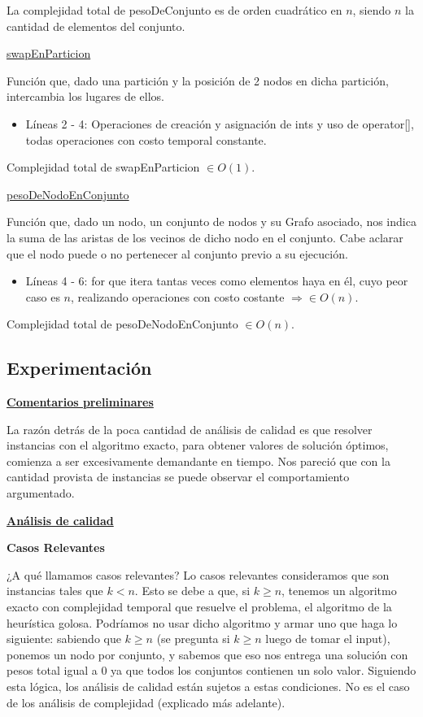 \documentclass[10pt,a4paper]{article}
\begin{document}
La complejidad total de pesoDeConjunto es de orden cuadrático en $n$, siendo $n$ la cantidad de elementos del conjunto.

\underline{swapEnParticion}

Función que, dado una partición y la posición de 2 nodos en dicha partición, intercambia los lugares de ellos.

\begin{itemize}
\item Líneas 2 - 4: Operaciones de creación y asignación de ints y uso de operator[], todas operaciones con costo temporal constante.
\end{itemize}

Complejidad total de swapEnParticion $\in O(1)$.

\underline{pesoDeNodoEnConjunto}

Función que, dado un nodo, un conjunto de nodos y su Grafo asociado, nos indica la suma de las aristas de los vecinos de dicho nodo en el conjunto. Cabe aclarar que el nodo puede o no pertenecer al conjunto previo a su ejecución.

\begin{itemize}
\item Líneas 4 - 6: for que itera tantas veces como elementos haya en él, cuyo peor caso es $n$, realizando operaciones con costo costante $\Rightarrow \in O(n)$.
\end{itemize}

Complejidad total de pesoDeNodoEnConjunto $\in O(n)$.

\newpage
\subsection{Experimentación}
\noindent \textbf{\underline{Comentarios preliminares}}

La razón detrás de la poca cantidad de análisis de calidad es que resolver instancias con el algoritmo exacto, para obtener valores de solución óptimos, comienza a ser excesivamente demandante en tiempo. Nos pareció que con la cantidad provista de instancias se puede observar el comportamiento argumentado.

\noindent \textbf{\underline{Análisis de calidad}}

\textbf{Casos Relevantes}

¿A qué llamamos casos relevantes? Lo casos relevantes consideramos que son instancias tales que $k < n$. Esto se debe a que, si $k \geq n$, tenemos un algoritmo exacto con complejidad temporal que resuelve el problema, el algoritmo de la heurística golosa. Podríamos no usar dicho algoritmo y armar uno que haga lo siguiente: sabiendo que $k \geq n$ (se pregunta si $k \geq n$ luego de tomar el input), ponemos un nodo por conjunto, y sabemos que eso nos entrega una solución con pesos total igual a $0$ ya que todos los conjuntos contienen un solo valor.
Siguiendo esta lógica, los análisis de calidad están sujetos a estas condiciones. No es el caso de los análisis de complejidad (explicado más adelante).
\end{document}
